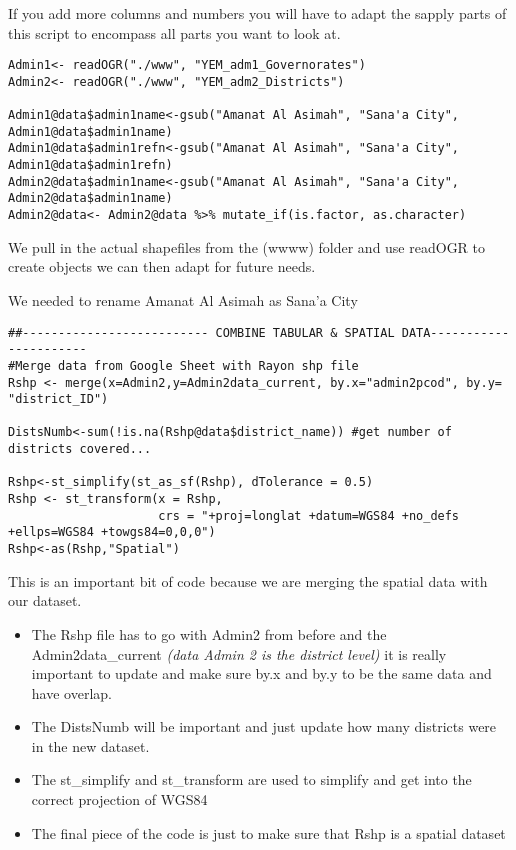 \documentclass[
]{article}
\providecommand{\tightlist}{%
  \setlength{\itemsep}{0pt}\setlength{\parskip}{0pt}}
\begin{document}
If you add more columns and numbers you will have to adapt the sapply
parts of this script to encompass all parts you want to look at.

\begin{verbatim}
Admin1<- readOGR("./www", "YEM_adm1_Governorates")
Admin2<- readOGR("./www", "YEM_adm2_Districts")

Admin1@data$admin1name<-gsub("Amanat Al Asimah", "Sana'a City", Admin1@data$admin1name)
Admin1@data$admin1refn<-gsub("Amanat Al Asimah", "Sana'a City", Admin1@data$admin1refn)
Admin2@data$admin1name<-gsub("Amanat Al Asimah", "Sana'a City", Admin2@data$admin1name)
Admin2@data<- Admin2@data %>% mutate_if(is.factor, as.character) 
\end{verbatim}

We pull in the actual shapefiles from the (wwww) folder and use readOGR
to create objects we can then adapt for future needs.

We needed to rename Amanat Al Asimah as Sana'a City

\begin{verbatim}
##-------------------------- COMBINE TABULAR & SPATIAL DATA----------------------
#Merge data from Google Sheet with Rayon shp file
Rshp <- merge(x=Admin2,y=Admin2data_current, by.x="admin2pcod", by.y= "district_ID")

DistsNumb<-sum(!is.na(Rshp@data$district_name)) #get number of districts covered...

Rshp<-st_simplify(st_as_sf(Rshp), dTolerance = 0.5)
Rshp <- st_transform(x = Rshp, 
                     crs = "+proj=longlat +datum=WGS84 +no_defs +ellps=WGS84 +towgs84=0,0,0")
Rshp<-as(Rshp,"Spatial")
\end{verbatim}

This is an important bit of code because we are merging the spatial data
with our dataset.

\begin{itemize}
\tightlist
\item
  The Rshp file has to go with Admin2 from before and the
  Admin2data\_current \emph{(data Admin 2 is the district level)} it is
  really important to update and make sure by.x and by.y to be the same
  data and have overlap.
\item
  The DistsNumb will be important and just update how many districts
  were in the new dataset.
\item
  The st\_simplify and st\_transform are used to simplify and get into
  the correct projection of WGS84
\item
  The final piece of the code is just to make sure that Rshp is a
  spatial dataset
\end{itemize}
\end{document}
